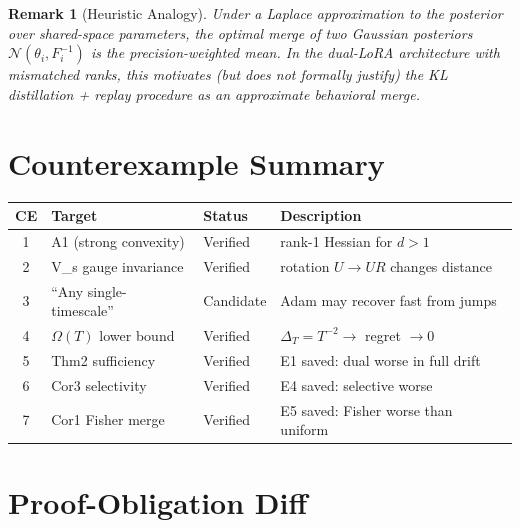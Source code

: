 \documentclass[11pt,a4paper]{article}
\newtheorem{remark}{Remark}
\begin{document}
\begin{afterbox}
\begin{remark}[Heuristic Analogy]
Under a Laplace approximation to the posterior over shared-space parameters,
the optimal merge of two Gaussian posteriors
$\mathcal{N}(\theta_i, F_i^{-1})$ is the precision-weighted mean.
In the dual-LoRA architecture with mismatched ranks, this motivates
(but does not formally justify) the KL distillation + replay procedure
as an approximate behavioral merge.
\end{remark}
\end{afterbox}

\section{Counterexample Summary}

\begin{center}
\begin{tabular}{clll}
\toprule
\textbf{CE} & \textbf{Target} & \textbf{Status} & \textbf{Description} \\
\midrule
1 & A1 (strong convexity)      & Verified   & rank-1 Hessian for $d>1$ \\
2 & V\_s gauge invariance       & Verified   & rotation $U \to UR$ changes distance \\
3 & ``Any single-timescale''   & Candidate  & Adam may recover fast from jumps \\
4 & $\Omega(T)$ lower bound    & Verified   & $\Delta_T = T^{-2} \to$ regret $\to 0$ \\
5 & Thm2 sufficiency           & Verified   & E1 saved: dual worse in full drift \\
6 & Cor3 selectivity           & Verified   & E4 saved: selective worse \\
7 & Cor1 Fisher merge          & Verified   & E5 saved: Fisher worse than uniform \\
\bottomrule
\end{tabular}
\end{center}

\section{Proof-Obligation Diff}
\end{document}
